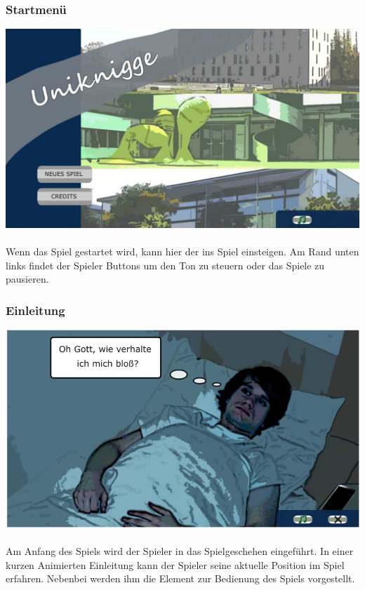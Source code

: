 \documentclass[a4paper, 11pt]{article} %
\begin{document}
\subsubsection{Startmenü}
\includegraphics[scale=0.46]{images/spiel/startmenue.png}\\\\
Wenn das Spiel gestartet wird, kann hier der ins Spiel einsteigen. Am Rand unten links findet der Spieler Buttons um den Ton zu steuern oder das Spiele zu pausieren.

\subsubsection{Einleitung}
\includegraphics[scale=0.535]{images/spiel/2.png}\\\\
Am Anfang des Spiels wird der Spieler in das Spielgeschehen eingeführt. In einer kurzen Animierten Einleitung kann der Spieler seine aktuelle Position im Spiel erfahren. Nebenbei werden ihm die Element zur Bedienung des Spiels vorgestellt.
\end{document}
